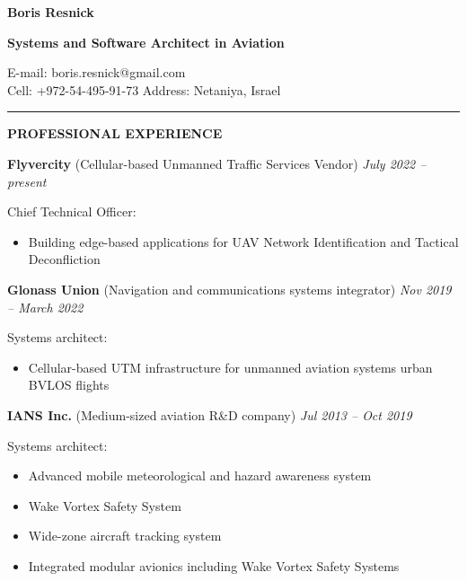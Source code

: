 \documentclass[a4paper]{article}
\begin{document}
    \thispagestyle{empty}
    
	\begin{center}
		{\Large \textbf{Boris Resnick}\par}
		\vspace{2mm}
		{\large \textbf{Systems and Software Architect in A\hspace{-.4mm}viation}\par}
		\vspace{1.5mm}
		E-mail: boris.resnick@gmail.com \vspace{1.5mm} \\
		Cell: +972-54-495-91-73 \quad \quad
		Address: Netaniya, Israel
	\end{center}
	\vspace{-2mm}
	\rule{\textwidth}{1pt}
	\vspace{2mm}

	\textbf{PROFESSIONAL EXPERIENCE}
	\vspace{4mm}

	\textbf{Flyvercity} (Cellular-based Unmanned Traffic Services Vendor) \hfill \textit{July 2022 -- present}
    \vspace{1mm}

	Chief Technical Officer:
	\begin{itemize}
	    \setlength{\itemindent}{.5cm}
	    \item Building edge-based applications for UAV Network Identification and Tactical Deconfliction
    \end{itemize}
    \vspace{2mm}

	\textbf{Glonass Union} (Navigation and communications systems integrator) \hfill \textit{Nov 2019 -- March 2022}
	\vspace{1mm}
	
    Systems architect:
	\begin{itemize}
	    \setlength{\itemindent}{.5cm}
	    \item Cellular-based UTM infrastructure for unmanned aviation systems urban BVLOS flights
    \end{itemize}
    \vspace{2mm}
    
    \textbf{IANS Inc.} (Medium-sized aviation R\&D company) \hfill \textit{ Jul 2013 -- Oct 2019}
    \vspace{1mm}
    
    Systems architect:
	\begin{itemize}
	    \setlength{\itemindent}{.5cm}
	    \item Advanced mobile meteorological and hazard awareness system
	    \item Wake Vortex Safety System
	    \item Wide-zone aircraft tracking system
	    \item Integrated modular avionics including Wake Vortex Safety Systems
    \end{itemize}
    \vspace{2mm}
    
\end{document}

